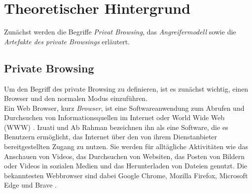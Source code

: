 \chapter{Theoretischer Hintergrund}

Zunächst werden die Begriffe \textit{Privat Browsing}, das \textit{Angreifermodell} sowie die \textit{Artefakte des private Browsings} erläutert.

\section{Private Browsing}
\begin{comment}
Definition Web Browser: 	
	> \cite{Rochmadi.2017}
		•	Der Webbrowser ist eine Softwareanwendung zum Abrufen, Präsentieren und Durchsuchen von Informationsressourcen im Internet oder World Wide Web (WWW).
		•	Eine Informationsquelle wird durch einen Uniform Resource Identifier (URI) identifiziert und kann Webseiten, Bilder, Videos oder andere Inhalte enthalten.
		
	> \cite{Izzati.2022}
		•	Ein Webbrowser ist eine Software, die es Benutzern ermöglicht, das Internet über den von ihrem Dienstanbieter bereitgestellten Zugang zu nutzen.
		•	Die bekanntesten Webbrowser sind Google Chrome, Mozilla Firefox, Microsoft Edge und Brave.
		•	Webbrowser werden für alltägliche Aktivitäten wie das Anschauen von Videos, das Durchsuchen von Webseiten, das Posten von Bildern oder Videos in sozialen Medien und das Herunterladen und Hochladen von Dateien genutzt.
		•	Browser-Modi: Es gibt zwei verschiedene Browser-Modi: den normalen Browser-Modus und den privaten Browser-Modus.
\end{comment}
Um den Begriff des private Browsing zu definieren, ist es zunächst wichtig, einen Browser und den \glqq{}normalen\grqq{} Modus einzuführen.\\
Ein Web Browser, kurz \textit{Browser}, ist eine Softwareanwendung zum Abrufen und Durchsuchen von Informationsquellen im Internet oder World Wide Web (WWW) \cite{Rochmadi.2017}. Izuati und Ab Rahman \cite{Izzati.2022} bezeichnen ihn als eine Software, die es Benutzern ermöglicht, das Internet über den von ihrem Dienstanbieter bereitgestellten Zugang zu nutzen. Sie werden für alltägliche Aktivitäten wie das Anschauen von Videos, das Durchsuchen von Websiten, das Posten von Bildern oder Videos in sozialen Medien und das Herunterladen von Dateien genutzt. Die bekanntesten Webbrowser sind dabei Google Chrome, Mozilla Firefox, Microsoft Edge und Brave \cite{Izzati.2022}.\\
